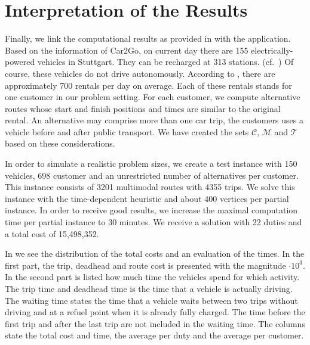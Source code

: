 
\section{Interpretation of the Results}

Finally, we link the computational results as provided in  with the application. Based on the information of Car2Go, on current day there are 155 electrically-powered vehicles in Stuttgart. They can be recharged at 313 stations. (cf.~\cite[p.~144]{Kaiser}) Of course, these vehicles do not drive autonomously. According to , there are approximately 700 rentals per day on average. Each of these rentals stands for one customer in our problem setting. For each customer, we compute alternative routes whose start and finish positions and times are similar to the original rental. An alternative may comprise more than one car trip, \ie the customers uses a vehicle before and after public transport. We have created the sets $\mathcal{C}$, $\mathcal{M}$ and $\mathcal{T}$ based on these considerations.

In order to simulate a realistic problem sizes, we create a test instance with 150 vehicles, 698 customer and an unrestricted number of alternatives per customer. This instance consists of 3201 multimodal routes with 4355 trips. We solve this instance with the time-dependent heuristic and about 400 vertices per partial instance. In order to receive good results, we increase the maximal computation time per partial instance to 30 minutes. We receive a solution with 22 duties and a total cost of 15,498,352.

In  we see the distribution of the total costs and an evaluation of the times. In the first part, the trip, deadhead and route cost is presented with the magnitude ${\cdot 10^3}$. In the second part is listed how much time the vehicles spend for which activity. The trip time and deadhead time is the time that a vehicle is actually driving. The waiting time states the time that a vehicle waits between two trips without driving and at a refuel point when it is already fully charged. The time before the first trip and after the last trip are not included in the waiting time. The columns state the total cost and time, the average per duty and the average per customer. 

